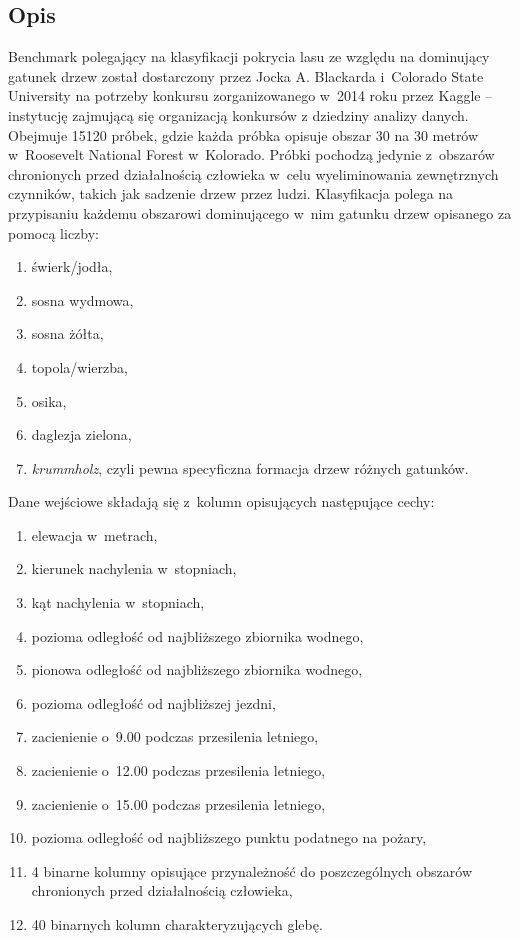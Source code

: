 \documentclass[pl]{minipw} %
\begin{document}
\subsection{Opis}
Benchmark polegający na klasyfikacji pokrycia lasu ze względu na dominujący gatunek drzew został dostarczony przez Jocka A. Blackarda i~Colorado State University na potrzeby konkursu zorganizowanego w~2014 roku przez Kaggle \cite{forest_cover} -- instytucję zajmującą się organizacją konkursów z dziedziny analizy danych. Obejmuje 15120 próbek, gdzie każda próbka opisuje obszar 30 na 30 metrów w~Roosevelt National Forest w~Kolorado. Próbki pochodzą jedynie z~obszarów chronionych przed działalnością człowieka w~celu wyeliminowania zewnętrznych czynników, takich jak sadzenie drzew przez ludzi. Klasyfikacja polega na przypisaniu każdemu obszarowi dominującego w~nim gatunku drzew opisanego za pomocą liczby:
\begin{enumerate}
\item świerk/jodła,
\item sosna wydmowa,
\item sosna żółta,
\item topola/wierzba,
\item osika,
\item daglezja zielona,
\item \textit{krummholz}, czyli pewna specyficzna formacja drzew różnych gatunków.
\end{enumerate}
Dane wejściowe składają się z~kolumn opisujących następujące cechy:
\begin{enumerate}
\item elewacja w~metrach,
\item kierunek nachylenia w~stopniach,
\item kąt nachylenia w~stopniach,
\item pozioma odległość od najbliższego zbiornika wodnego,
\item pionowa odległość od najbliższego zbiornika wodnego,
\item pozioma odległość od najbliższej jezdni,
\item zacienienie o~9.00 podczas przesilenia letniego,
\item zacienienie o~12.00 podczas przesilenia letniego,
\item zacienienie o~15.00 podczas przesilenia letniego,
\item pozioma odległość od najbliższego punktu podatnego na pożary,
\item 4 binarne kolumny opisujące przynależność do poszczególnych obszarów chronionych przed działalnością człowieka,
\item 40 binarnych kolumn charakteryzujących glebę.
\end{enumerate}
\end{document}
